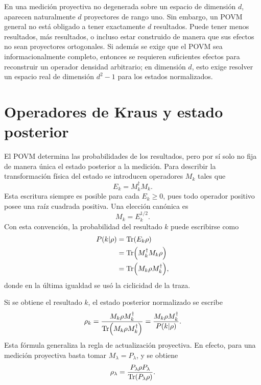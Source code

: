 \documentclass[../main.tex]{subfiles}
\begin{document}
\begin{observacion}
En una medición proyectiva no degenerada sobre un espacio de dimensión $d$, aparecen naturalmente $d$ proyectores de rango uno. Sin embargo, un POVM general no está obligado a tener exactamente $d$ resultados. Puede tener menos resultados, más resultados, o incluso estar construido de manera que sus efectos no sean proyectores ortogonales. Si además se exige que el POVM sea informacionalmente completo, entonces se requieren suficientes efectos para reconstruir un operador densidad arbitrario; en dimensión $d$, esto exige resolver un espacio real de dimensión $d^2-1$ para los estados normalizados.
\end{observacion}

\section{Operadores de Kraus y estado posterior}

El POVM determina las probabilidades de los resultados, pero por sí solo no fija de manera única el estado posterior a la medición. Para describir la transformación física del estado se introducen operadores $M_k$ tales que
\begin{equation*}
    E_k=M_k^\dagger M_k.
\end{equation*}
Esta escritura siempre es posible para cada $E_k\geq0$, pues todo operador positivo posee una raíz cuadrada positiva. Una elección canónica es
\begin{equation*}
    M_k=E_k^{1/2}.
\end{equation*}
Con esta convención, la probabilidad del resultado $k$ puede escribirse como
\begin{align*}
    P(k|\rho)
    &=\Tr(E_k\rho)\\
    &=\Tr(M_k^\dagger M_k\rho)\\
    &=\Tr(M_k\rho M_k^\dagger),
\end{align*}
donde en la última igualdad se usó la ciclicidad de la traza.

Si se obtiene el resultado $k$, el estado posterior normalizado se escribe
\begin{equation*}
    \rho_k=
    \frac{M_k\rho M_k^\dagger}
    {\Tr(M_k\rho M_k^\dagger)}
    =
    \frac{M_k\rho M_k^\dagger}{P(k|\rho)}.
\end{equation*}
Esta fórmula generaliza la regla de actualización proyectiva. En efecto, para una medición proyectiva basta tomar $M_\lambda=P_\lambda$, y se obtiene
\begin{equation*}
    \rho_\lambda=
    \frac{P_\lambda\rho P_\lambda}
    {\Tr(P_\lambda\rho)}.
\end{equation*}
\end{document}
